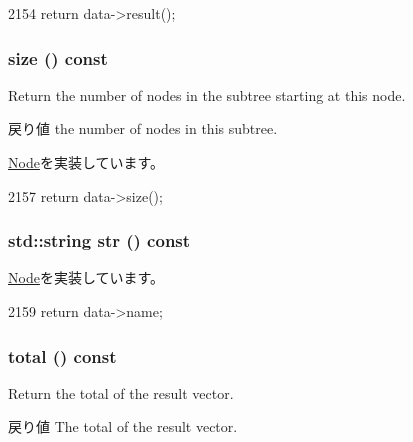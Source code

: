 \begin{DoxyCode}
2154 { return data->result(); }
\end{DoxyCode}
\hypertarget{classStats_1_1VectorStatNode_a503ab01f6c0142145d3434f6924714e7}{
\subsubsection[{size}]{ size () const}}
\label{classStats_1_1VectorStatNode_a503ab01f6c0142145d3434f6924714e7}
Return the number of nodes in the subtree starting at this node. \begin{DoxyReturn}{戻り値}
the number of nodes in this subtree. 
\end{DoxyReturn}


\hyperlink{classStats_1_1Node_a4051d143efd31726fa13df03ae4e1bce}{Node}を実装しています。


\begin{DoxyCode}
2157 { return data->size(); }
\end{DoxyCode}
\hypertarget{classStats_1_1VectorStatNode_a1b9b8885b0880fc4ddf9a2c7d1ca3dc4}{
\subsubsection[{str}]{\setlength{\rightskip}{0pt plus 5cm}std::string str () const}}
\label{classStats_1_1VectorStatNode_a1b9b8885b0880fc4ddf9a2c7d1ca3dc4}


\hyperlink{classStats_1_1Node_a6522bc65bd97a6b1ef6cdfe78462a919}{Node}を実装しています。


\begin{DoxyCode}
2159 { return data->name; }
\end{DoxyCode}
\hypertarget{classStats_1_1VectorStatNode_a35c6e2ed3fc81b40d69052a062113ead}{
\subsubsection[{total}]{ total () const}}
\label{classStats_1_1VectorStatNode_a35c6e2ed3fc81b40d69052a062113ead}
Return the total of the result vector. \begin{DoxyReturn}{戻り値}
The total of the result vector. 
\end{DoxyReturn}


